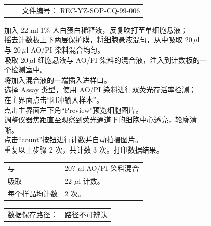 \documentclass[UTF8,10pt,a4paper,fontset=fandol]{ctexart}
\newcommand{\fieldvalue}[1]{#1}
\newcommand{\handwritten}[1]{#1}
\begin{document}
\noindent
\begin{tabularx}{\textwidth}{@{}lXr@{}}
 & & 文件编号：%
\fieldvalue{\handwritten{REC-YZ-SOP-CQ-99-006}}\\
\end{tabularx}

\noindent
加入 22 ml 1\% 人白蛋白稀释液，反复吹打至单细胞悬液；\\
摇去计数板上下两层保护膜，将细胞悬液混匀，从中吸取 20\,$\mu$l\\
与 20\,$\mu$l AO/PI 染料混合均匀。\\
吸取 20\,$\mu$l 细胞悬液与 AO/PI 染料的混合液，注入到计数板的一\\
个检测室中。\\
将加入混合液的一端插入进样口。\\
选择 Assay 类型，使用 AO/PI 染料进行双荧光存活率检测；\\
在主界面点击“阻冲输入样本”。\\
点击主界面左下角“Preview”预览细胞图片。\\
调整仪器焦距直至观察到荧光通道下的细胞中心透亮，轮廓清\\
晰。\\
点击“count”按钮进行计数并自动拍摄图片。\\
重复以上步骤 2 次，共计数 3 次。打印数据结果。

\medskip

\noindent
\begin{tabularx}{\textwidth}{@{}lX@{}}
与 & %
\fieldvalue{\handwritten{20?}} $\mu$l AO/PI 染料混合\\[2pt]
吸取 & %
\fieldvalue{\handwritten{22}} $\mu$l 计数。\\[2pt]
每个样品均计数 & %
\fieldvalue{\handwritten{2}} 次。
\end{tabularx}

\medskip

\noindent
\begin{tabularx}{\textwidth}{@{}lX@{}}
数据保存路径：&
\fieldvalue{\handwritten{路径不可辨认}}
\end{tabularx}
\end{document}
